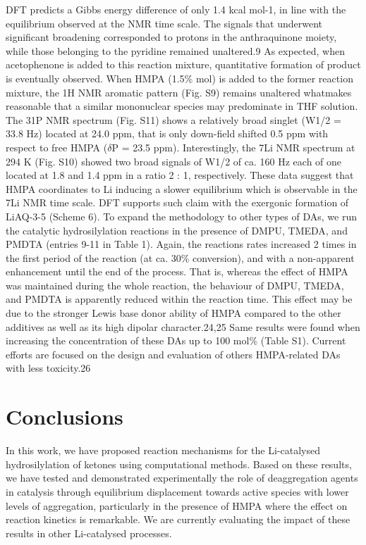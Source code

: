 \documentclass[journal=jacsat,manuscript=article]{achemso}
\begin{document}
	DFT predicts a Gibbs energy difference of only 1.4 kcal mol-1, in line with the equilibrium observed at the NMR time scale. The signals that underwent significant broadening corresponded to protons in the anthraquinone moiety, while those belonging to the pyridine remained unaltered.9 As expected, when acetophenone is added to this reaction mixture, quantitative formation of product is eventually observed. When HMPA (1.5\% mol) is added to the former reaction mixture, the 1H NMR aromatic pattern (Fig. S9) remains unaltered whatmakes reasonable that a similar mononuclear species may predominate	in THF solution. The 31P NMR spectrum (Fig. S11) shows a relatively broad singlet (W1/2 = 33.8 Hz) located at 24.0 ppm, that is only down-field shifted 0.5 ppm with respect to free HMPA ($\delta$P = 23.5 ppm). Interestingly, the 7Li NMR spectrum at 294 K (Fig. S10) showed two broad signals of W1/2 of ca. 160 Hz each of one located at 1.8 and 1.4 ppm in a ratio 2 : 1, respectively. These data suggest that HMPA coordinates to Li inducing a slower equilibrium which is observable in the	7Li NMR time scale. DFT supports such claim with the exergonic formation of LiAQ-3-5 (Scheme 6). To expand the methodology to other types of DAs, we run the catalytic hydrosilylation reactions in the presence of DMPU, TMEDA, and PMDTA (entries 9-11 in Table 1). Again, the reactions rates increased 2 times in the first period of the	reaction (at ca. 30\% conversion), and with a non-apparent enhancement until the end of the process. That is, whereas the effect of HMPA was maintained during the whole reaction, the behaviour of DMPU, TMEDA, and PMDTA is apparently reduced within the reaction time. This effect may be due to the stronger Lewis base donor ability of HMPA compared to the other additives as well as its high dipolar character.24,25 Same results were found when increasing the concentration of these DAs up to 100 mol\% (Table S1). Current efforts are focused on the design and evaluation of others HMPA-related DAs with less toxicity.26
	
	
	\section{Conclusions}
	In this work, we have proposed reaction mechanisms for the Li-catalysed hydrosilylation of ketones using computational methods. Based on these results, we have tested and demonstrated
	experimentally the role of deaggregation agents in catalysis through equilibrium displacement towards active species with lower levels of aggregation, particularly in the presence of
	HMPA where the effect on reaction kinetics is remarkable. We are currently evaluating the impact of these results in other Li-catalysed processes.
\end{document}
